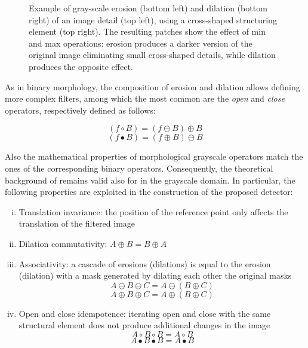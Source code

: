 \documentclass{ieeeaccess}
\begin{document}
\begin{figure}[h!]
\begin{tabular}{cc}
	\end{tabular}
	\caption{Example of gray-scale erosion (bottom left) and dilation (bottom right) of an image detail (top left), using a cross-shaped structuring element (top right). The resulting patches show the effect of min and max operations: erosion produces a darker version of the original image eliminating small cross-shaped details, while dilation produces the opposite effect.}
\end{figure}

As in binary morphology, the composition of erosion and dilation allows defining more complex filters, among which the most common are the \textit{open} and \textit{close} operators, respectively defined as follows:

\begin{equation}
(f \circ B) = (f \ominus B) \oplus B
\end{equation}
\begin{equation}
(f \bullet B) = (f \oplus B) \ominus B
\end{equation}

Also the mathematical properties of morphological grayscale operators match the ones of the corresponding binary operators. Consequently, the theoretical background of \cite{de2017detecting} remains valid also for in the grayscale domain. In particular, the following properties are exploited in the construction of the proposed detector:

\begin{enumerate}[(i)]
	\item Translation invariance: the position of the reference point only affects the translation of the filtered image
	\item Dilation commutativity: $A\oplus B = B \oplus A$
	\item Associativity: a cascade of erosions (dilations) is equal to the erosion (dilation) with a mask generated by dilating each other the original masks
	\begin{equation}
	A \ominus B \ominus C = A \ominus (B \oplus C)
	\end{equation}
	\begin{equation}
	A \oplus B \oplus C = A \oplus (B \oplus C)
	\end{equation} 
	\item Open and close idempotence: iterating open and close with the same structural element does not produce additional changes in the image
	\begin{equation}
	A \circ B \circ B = A \circ B
	\end{equation}
	\begin{equation}
	A \bullet B \bullet B = A \bullet B
	\end{equation} 
\end{enumerate}
\end{document}
